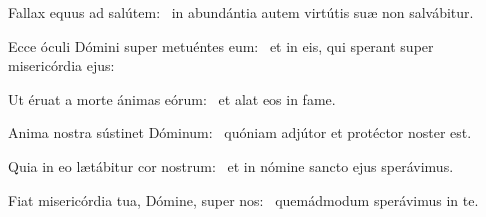 \item Fallax equus ad salútem:~\psstar{} in abundántia autem virtútis suæ non salvábitur.

\item Ecce óculi Dómini super metuéntes eum:~\psstar{} et in eis, qui sperant super misericórdia ejus:

\item Ut éruat a morte ánimas eórum:~\psstar{} et alat eos in fame.

\item Anima nostra sústinet Dóminum:~\psstar{} quóniam adjútor et protéctor noster est.

\item Quia in eo lætábitur cor nostrum:~\psstar{} et in nómine sancto ejus sperávimus.

\item Fiat misericórdia tua, Dómine, super nos:~\psstar{} quemádmodum sperávimus in te.

